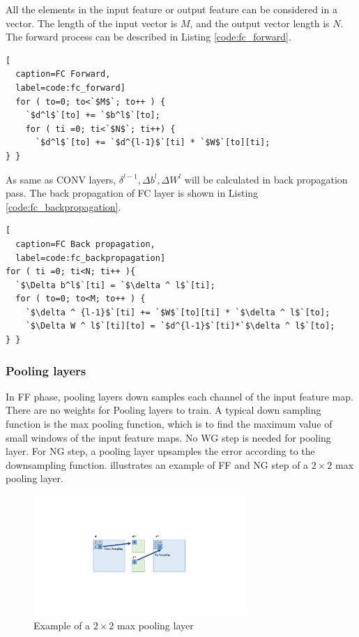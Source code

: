 All the elements in the input feature or output feature can be considered in a vector. The length of the input vector is $M$, and the output vector length is $N$. The forward process can be described in Listing \ref{code:fc_forward}.

\begin{minipage}{\linewidth}
\begin{lstlisting}[
  caption=FC Forward,
  label=code:fc_forward]
  for ( to=0; to<`$M$`; to++ ) {
    `$d^l$`[to] += `$b^l$`[to];
    for ( ti =0; ti<`$N$`; ti++) {
      `$d^l$`[to] += `$d^{l-1}$`[ti] * `$W$`[to][ti];
} }
\end{lstlisting}
\end{minipage}

As same as CONV layers,  $\delta ^{l-1} , \Delta b^l, \Delta W^l$ will be calculated in back propagation pass. The back propagation of FC layer is shown in Listing \ref{code:fc_backpropagation}.

\begin{minipage}{\linewidth}
\begin{lstlisting}[
  caption=FC Back propagation,
  label=code:fc_backpropagation]
for ( ti =0; ti<N; ti++ ){
  `$\Delta b^l$`[ti] = `$\delta ^ l$`[ti];
  for ( to=0; to<M; to++ ) {
    `$\delta ^ {l-1}$`[ti] += `$W$`[to][ti] * `$\delta ^ l$`[to];     
    `$\Delta W ^ l$`[ti][to] = `$d^{l-1}$`[ti]*`$\delta ^ l$`[to];
} }
\end{lstlisting}
\end{minipage}

\subsubsection{Pooling layers}
In FF phase, pooling layers down samples each channel of the input feature map. There are no weights for Pooling layers to train. A typical down sampling function is the max pooling function, which is to find the maximum value of small windows of the input feature maps. No WG step is needed for pooling layer. For NG step, a pooling layer upsamples the error according to the downsampling function.  illustrates an example of FF and NG step of a $2\times 2$ max pooling layer.
\begin{figure}[htbp]
    \centering\includegraphics[width=3.2in]{figures/pool.pdf}
    \caption{Example of a $2\times 2$ max pooling layer}\label{fig:pool}
\end{figure}